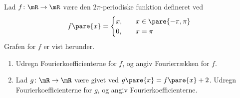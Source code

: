 \begin{opg}
Lad $f\colon\mR\to\mR$ være den $2\pi$-periodiske funktion defineret ved
$$ f\pare{x} = \begin{cases}
    x, &\quad x\in\pare{-\pi,\pi} \\
    0, &\quad x = \pi 
\end{cases} $$
Grafen for $f$ er vist herunder.
\begin{center}
\end{center}
\begin{enumerate}
    \item Udregn Fourierkoefficienterne for $f$, og angiv Fourierrækken for $f$.
    
    \iffalse\begin{proof}[Løsning]
    Lad $k\in\mZ\setminus\{0\}$. Da haves
    $$ c_k = \intFourier{xe^{-ikx}} = i\frac{\pare{-1}^k}{k}, $$
    og $c_0 = 0$. Fourierrækken for $f$ er således
    $$ \sum_{k=1}^\infty i\frac{\pare{-1}^k}{k}\pare{e^{ikx} - e^{-ikx}} $$ 
    Bemærk desuden, at på cosinus-sinus formen fås
    $$ a_0 = 0, \quad a_k = i\frac{\pare{-1}^k}{k} - i\frac{\pare{-1}^k}{k} = 0, \Quad b_k = i\pare{i\frac{\pare{-1}^k}{k} + i\frac{\pare{-1}^k}{k}}
        = 2\frac{\pare{-1}^{k+1}}{k}, $$
    altså bliver Fourierrækken
    $$ \sum_{n=1}^\infty 2\frac{\pare{-1}^{n+1}}{n}\sin\pare{nx} $$
    \end{proof}\fi
    
    \item Lad $g\colon\mR\to\mR$ være givet ved $g\pare{x} = f\pare{x} + 2$. Udregn Fourierkoefficienterne for $g$, og angiv Fourierkoefficienterne. 
    

\end{enumerate}
\end{opg}
